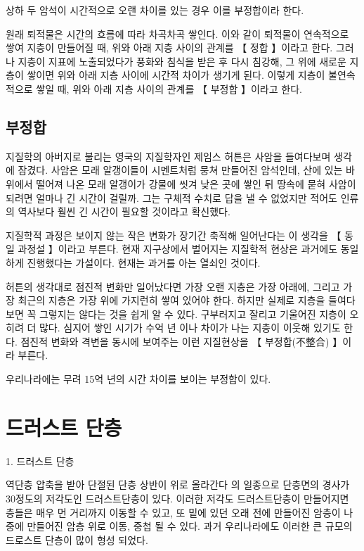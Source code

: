 \documentclass[12pt, a4paper, oneside]{book}
\begin{document}
	상하 두 암석이 시간적으로 오랜 차이를 있는 경우 이를 부정합이라 한다.

원래 퇴적물은 시간의 흐름에 따라 차곡차곡 쌓인다. 이와 같이 퇴적물이 연속적으로 쌓여 지층이 만들어질 때, 위와 아래 지층 사이의 관계를 【 정합 】이라고 한다. 그러나 지층이 지표에 노출되었다가 풍화와 침식을 받은 후 다시 침강해, 그 위에 새로운 지층이 쌓이면 위와 아래 지층 사이에 시간적 차이가 생기게 된다. 이렇게 지층이 불연속적으로 쌓일 때, 위와 아래 지층 사이의 관계를 【 부정합 】이라고 한다.



\subsection{부정합}

지질학의 아버지로 불리는 영국의 지질학자인 제임스 허튼은 사암을 들여다보며 생각에 잠겼다. 사암은 모래 알갱이들이 시멘트처럼 뭉쳐 만들어진 암석인데, 산에 있는 바위에서 떨어져 나온 모래 알갱이가 강물에 씻겨 낮은 곳에 쌓인 뒤 땅속에 묻혀 사암이 되려면 얼마나 긴 시간이 걸릴까. 그는 구체적 수치로 답을 낼 수 없었지만 적어도 인류의 역사보다 훨씬 긴 시간이 필요할 것이라고 확신했다.

지질학적 과정은 보이지 않는 작은 변화가 장기간 축적해 일어난다는 이 생각을 【 동일 과정설 】이라고 부른다. 현재 지구상에서 벌어지는 지질학적 현상은 과거에도 동일하게 진행했다는 가설이다. 현재는 과거를 아는 열쇠인 것이다. 

허튼의 생각대로 점진적 변화만 일어났다면 가장 오랜 지층은 가장 아래에, 그리고 가장 최근의 지층은 가장 위에 가지런히 쌓여 있어야 한다. 하지만 실제로 지층을 들여다보면 꼭 그렇지는 않다는 것을 쉽게 알 수 있다. 구부러지고 잘리고 기울어진 지층이 오히려 더 많다. 심지어 쌓인 시기가 수억 년 이나 차이가 나는 지층이 이웃해 있기도 한다. 점진적 변화와 격변을 동시에 보여주는 이런 지질현상을 【 부정합(不整合) 】이라 부른다. 

우리나라에는 무려 15억 년의 시간 차이를 보이는 부정합이 있다.





	\newpage  \null
	\section{드러스트 단층}



1. 		드러스트 단층

역단층 압축을 받아 단절된 단층 상반이 위로 올라간다
의 일종으로 단층면의 경사가 30정도의 저각도인 드러스트단층이 있다. 이러한 저각도 드러스트단층이 만들어지면 층들은 매우 먼 거리까지 이동할 수 있고, 또 밑에 있던 오래 전에 만들어진 암층이 나중에 만들어진 암층 위로 이동, 중첩 될 수 있다. 과거 우리나라에도 이러한 큰 규모의 드로스트 단층이 많이 형성 되었다.
\end{document}

